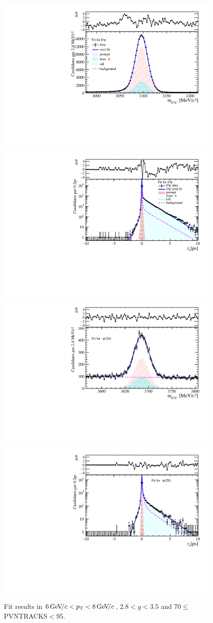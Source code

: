 \begin{figure}[H]
\begin{center}
\includegraphics[width=0.47\linewidth]{pdf/Jpsi/drawmass/n4y2pt4.pdf}
\includegraphics[width=0.47\linewidth]{pdf/Jpsi/2DFit/n4y2pt4.pdf}
\vspace*{-0.5cm}
\includegraphics[width=0.47\linewidth]{pdf/Psi2S/drawmass/n4y2pt4.pdf}
\includegraphics[width=0.47\linewidth]{pdf/Psi2S/2DFit/n4y2pt4.pdf}
\vspace*{-0.5cm}
\end{center}
\caption{Fit results in $6\text{\,Ge\kern -0.1em V\!/}c<p_{\mathrm{T}}<8\text{\,Ge\kern -0.1em V\!/}c$, $2.8<y<3.5$ and 70$\leq$PVNTRACKS$<$95.}
\label{Fitn4y2pt4}
\end{figure}
